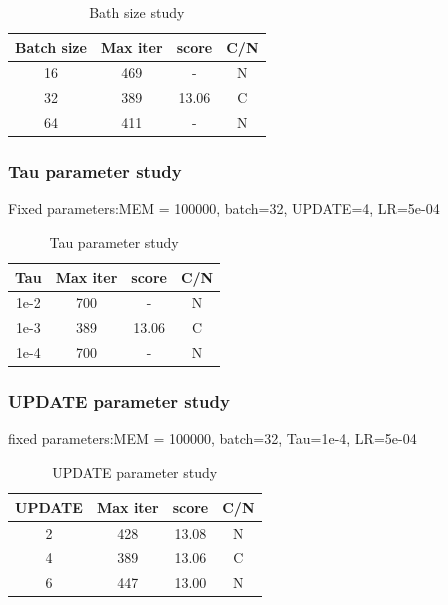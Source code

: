\documentclass[12pt]{article}
\begin{document}
\begin{table}[!htbp]
\centering
\begin{tabular}{|c|c|c|c|}
\hline
{\textbf{Batch size}} & {\textbf{Max iter}} & {\textbf{score}} & {\textbf{C/N}} \\ \hline
16 & 469 & -      & N \\ \hline
32  & 389 & 13.06 & C \\ \hline
64  & 411 & -     & N \\ \hline
\end{tabular}
\caption{Bath size study}
\label{tab:Batch}
\end{table}


\subsubsection{Tau parameter study}
Fixed parameters:MEM = 100000, batch=32, UPDATE=4, LR=5e-04

\begin{table}[!htbp]
\centering
\begin{tabular}{|c|c|c|c|}
\hline
{\textbf{Tau}} & {\textbf{Max iter}} & {\textbf{score}} & {\textbf{C/N}} \\ \hline
1e-2 & 700 & -     & N \\ \hline
1e-3 & 389 & 13.06 & C \\ \hline
1e-4 & 700 & -     & N \\ \hline
\end{tabular}
\caption{Tau parameter study}
\label{tab:Tau}
\end{table}


\subsubsection{UPDATE parameter study}
fixed parameters:MEM = 100000, batch=32, Tau=1e-4, LR=5e-04

\begin{table}[!htbp]
\centering
\begin{tabular}{|c|c|c|c|}
\hline
{\textbf{UPDATE}} & {\textbf{Max iter}} & {\textbf{score}} & {\textbf{C/N}} \\ \hline
2  & 428 & 13.08 & N \\ \hline
4  & 389 & 13.06 & C \\ \hline
6  & 447 & 13.00 & N \\ \hline
\end{tabular}
\caption{UPDATE parameter study}
\label{tab:UPDATE}
\end{table}
\end{document}
